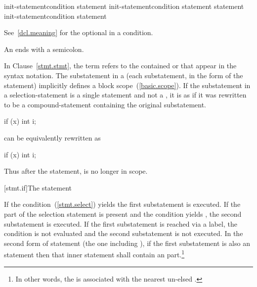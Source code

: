 %
%
%
\begin{bnf}
\br
     init-statement\opt condition \terminal{)} statement\br
     init-statement\opt condition \terminal{)} statement  statement\br
     init-statement\opt condition \terminal{)} statement
\end{bnf}

See~\ref{dcl.meaning} for the optional  in a condition.
\begin{note}
An  ends with a semicolon.
\end{note}
In Clause~\ref{stmt.stmt}, the term  refers to
the contained  or  that appear
in the syntax notation.
%
The substatement in a  (each substatement,
in the  form of the  statement) implicitly defines
a block scope~(\ref{basic.scope}). If the substatement in a
selection-statement is a single statement and not a
, it is as if it was rewritten to be a
compound-statement containing the original substatement.
\begin{example}

\begin{codeblock}
if (x)
  int i;
\end{codeblock}

can be equivalently rewritten as

\begin{codeblock}
if (x) {
  int i;
}
\end{codeblock}

Thus after the  statement,  is no longer in scope.
\end{example}

[stmt.if]{The  statement}%

\pnum
If the condition~(\ref{stmt.select}) yields  the first
substatement is executed. If the  part of the selection
statement is present and the condition yields , the second
substatement is executed. If the first substatement is reached via a
label, the condition is not evaluated and the second substatement is
not executed. In the second form of  statement
(the one including ), if the first substatement is also an
 statement then that inner  statement shall contain
an  part.\footnote{In other words, the  is associated with the nearest un-elsed
.}

